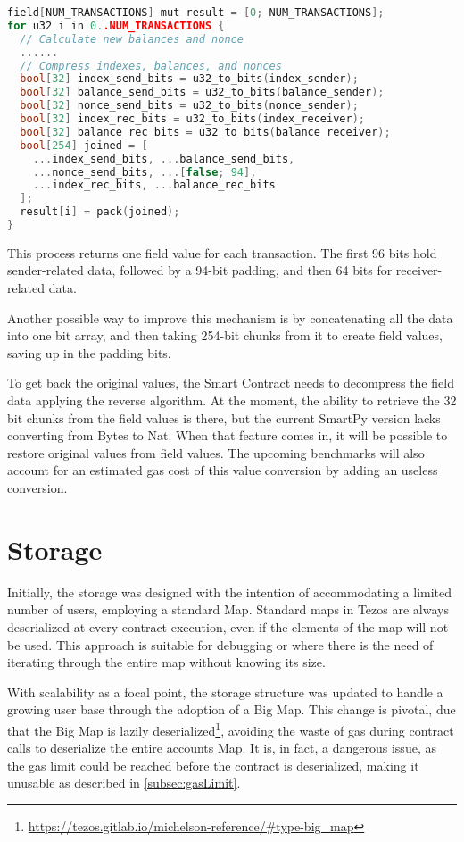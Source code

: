 \begin{lstlisting}[language=C++]
field[NUM_TRANSACTIONS] mut result = [0; NUM_TRANSACTIONS];
for u32 i in 0..NUM_TRANSACTIONS {
  // Calculate new balances and nonce
  ......
  // Compress indexes, balances, and nonces
  bool[32] index_send_bits = u32_to_bits(index_sender);
  bool[32] balance_send_bits = u32_to_bits(balance_sender);
  bool[32] nonce_send_bits = u32_to_bits(nonce_sender);
  bool[32] index_rec_bits = u32_to_bits(index_receiver);
  bool[32] balance_rec_bits = u32_to_bits(balance_receiver);
  bool[254] joined = [
    ...index_send_bits, ...balance_send_bits,
    ...nonce_send_bits, ...[false; 94],
    ...index_rec_bits, ...balance_rec_bits
  ];
  result[i] = pack(joined);
}
\end{lstlisting}

This process returns one field value for each transaction. The first 96 bits hold sender-related data, followed by a 94-bit padding, and then 64 bits for receiver-related data.

Another possible way to improve this mechanism is by concatenating all the data into one bit array, and then taking 254-bit chunks from it to create field values, saving up in the padding bits.

To get back the original values, the Smart Contract needs to decompress the field data applying the reverse algorithm. At the moment, the ability to retrieve the 32 bit chunks from the field values is there, but the current SmartPy version lacks converting from Bytes to Nat. When that feature comes in, it will be possible to restore original values from field values. The upcoming benchmarks will also account for an estimated gas cost of this value conversion by adding an useless conversion.

\section{Storage\label{sec:5_storage}}

Initially, the storage was designed with the intention of accommodating a limited number of users, employing a standard Map. Standard maps in Tezos are always deserialized at every contract execution, even if the elements of the map will not be used. This approach is suitable for debugging or where there is the need of iterating through the entire map without knowing its size.

With scalability as a focal point, the storage structure was updated to handle a growing user base through the adoption of a Big Map. This change is pivotal, due that the Big Map is lazily deserialized\footnote{\url{https://tezos.gitlab.io/michelson-reference/\#type-big_map}}, avoiding the waste of gas during contract calls to deserialize the entire accounts Map. It is, in fact, a dangerous issue, as the gas limit could be reached before the contract is deserialized, making it unusable as described in \ref{subsec:gasLimit}.

